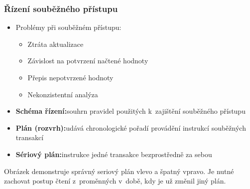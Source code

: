 \documentclass[a4paper,10pt]{article}
\newcommand{\pojem}[2]{\item \textbf{#1:}\quad #2}
\begin{document}
				\subsubsection{Řízení souběžného přístupu}
				\begin{itemize}
					\item Problémy při souběžném přístupu:
					\begin{itemize}
						\item Ztráta aktualizace
						\item Závislost na potvrzení načtené hodnoty
						\item Přepis nepotvrzené hodnoty
						\item Nekonzistentní analýza
					\end{itemize}
					\pojem{Schéma řízení}{souhrn pravidel použitých k~zajištění souběžného přístupu}
					\pojem{Plán (rozvrh)}{udává chronologické pořadí provádění instrukcí souběžných transakcí}
					\pojem{Sériový plán}{instrukce jedné transakce bezprostředně za sebou}
				\end{itemize}
				\begin{figure}[h!]
					\centering
				\end{figure}
				Obrázek demonstruje správný seriový plán vlevo a špatný vpravo. Je nutné zachovat postup čtení z~proměnných v~době, kdy je už změnil jiný plán.
\end{document}
